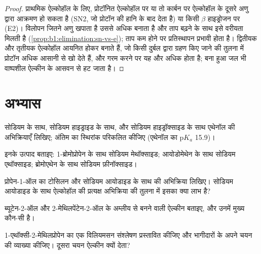 \begin{proof}
प्राथमिक ऐल्कोहॉल के लिए, प्रोटॉनित ऐल्कोहॉल पर या तो कार्बन पर
ऐल्कोहॉल के दूसरे अणु द्वारा आक्रमण हो सकता है (SN2, जो प्रोटॉन की हानि के बाद 
देता है) या किसी $\beta$ हाइड्रोजन पर (E2)। विलोपन जितने अणु खपाता है उससे अधिक
बनाता है और ताप बढ़ने के साथ इसे वरीयता मिलती है
(\cref{prop:b1:elimination:sn-vs-e}); ताप कम होने पर प्रतिस्थापन
प्रभावी होता है। द्वितीयक और तृतीयक ऐल्कोहॉल आयनित होकर  बनाते हैं, जो
किसी दुर्बल  द्वारा ग्रहण किए जाने की तुलना में प्रोटॉन अधिक आसानी से खो देते हैं, और
गरम करने पर यह और अधिक होता है; बना हुआ जल भी वाष्पशील ऐल्कीन के
आसवन से हट जाता है।
\end{proof}

\section{अभ्यास}

\begin{exercise}[$\star$]\label{exo:b1:alcohol-activation:1}
सोडियम के साथ, सोडियम हाइड्राइड के साथ, और सोडियम हाइड्रॉक्साइड के साथ एथेनॉल की
अभिक्रियाएँ लिखिए; अंतिम का स्थिरांक परिकलित कीजिए (एथेनॉल का $\mathrm{p}K_a$
15.9)।
\end{exercise}

\begin{exercise}[$\star$]\label{exo:b1:alcohol-activation:2}
इनके उत्पाद बताइए: 1-ब्रोमोप्रोपेन के साथ सोडियम मेथॉक्साइड; आयोडोमेथेन के साथ सोडियम
एथॉक्साइड; ब्रोमोएथेन के साथ सोडियम फ़ीनॉक्साइड।
\end{exercise}

\begin{exercise}[$\star$]\label{exo:b1:alcohol-activation:3}
प्रोपेन-1-ऑल का टोसिलन और सोडियम आयोडाइड के साथ  की अभिक्रिया
लिखिए। सोडियम आयोडाइड के साथ ऐल्कोहॉल की प्रत्यक्ष अभिक्रिया की तुलना में
इसका क्या लाभ है?
\end{exercise}

\begin{exercise}[$\star$]\label{exo:b1:alcohol-activation:4}
ब्यूटेन-2-ऑल और 2-मेथिलपेंटेन-2-ऑल के अम्लीय  से बनने वाली ऐल्कीन बताइए,
और उनमें मुख्य कौन-सी है।
\end{exercise}

\begin{exercise}[$\star\star$]\label{exo:b1:alcohol-activation:5}
1-एथॉक्सी-2-मेथिलप्रोपेन का एक विलियमसन संश्लेषण प्रस्तावित कीजिए और
भागीदारों के अपने चयन की व्याख्या कीजिए। दूसरा चयन ऐल्कीन क्यों देता?
\end{exercise}

